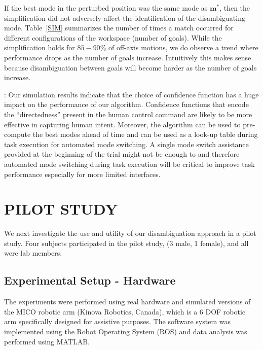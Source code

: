 \documentclass[conference]{IEEEtran}
\begin{document}
If the best mode in the perturbed position was the same mode as $\boldsymbol{m}^*$, then the simplification did not adversely affect the identification of the disambiguating mode. Table~\ref{SIM} summarizes the number of times a match occurred for different configurations of the workspace (number of goals). While the simplification holds for $85-90\%$ of off-axis motions, we do observe a trend where performance drops as the number of goals increase. Intuitively this makes sense because disambiguation between goals will become harder as the number of goals increase. 
 
:  Our simulation results indicate that the choice of confidence function has a huge impact on the performance of our algorithm. Confidence functions that encode the ``directedness'' present in the human control command are likely to be more effective in capturing human intent.
 Moreover, the algorithm can be used to pre-compute the best modes ahead of time and can be used as a look-up table during task execution for automated mode switching. A single mode switch assistance provided at the beginning of the trial might not be enough to and therefore automated mode switching during task execution will be critical to improve task performance especially for more limited interfaces. 
 \section{PILOT STUDY} \label{EXP}
 We next investigate the use and utility of our disambiguation approach in a pilot study. Four subjects participated in the pilot study, (3 male, 1 female), and all were lab members.
 \subsection{Experimental Setup - Hardware}
 
 The experiments were performed using real hardware and simulated versions of the MICO robotic arm (Kinova Robotics, Canada), which is a 6 DOF robotic arm specifically designed for assistive purposes. The software system was implemented using the Robot Operating System (ROS) and data analysis was performed using MATLAB. 
 
\end{document}
